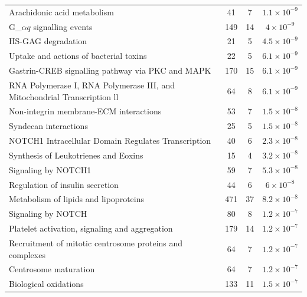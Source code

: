 \begin{table}[!Hp]
{\begin{tabular}{lccc}
  \rowcolor{Cluster_Red!20} 
  Arachidonic acid metabolism &  41 &   7 & $1.1 \times 10^{-9}$ \\ 
  \rowcolor{Cluster_Red!15} 
  G_${\alpha q}$ signalling events & 149 &  14 & $4 \times 10^{-9}$ \\ 
  \rowcolor{Cluster_Red!20} 
  HS-GAG degradation &  21 &   5 & $4.5 \times 10^{-9}$ \\ 
  \rowcolor{Cluster_Red!15} 
  Uptake and actions of bacterial toxins &  22 &   5 & $6.1 \times 10^{-9}$ \\ 
  \rowcolor{Cluster_Red!20} 
  Gastrin-CREB signalling pathway via PKC and MAPK & 170 &  15 & $6.1 \times 10^{-9}$ \\ 
  \rowcolor{Cluster_Red!15} 
  RNA Polymerase I, RNA Polymerase III, and Mitochondrial Transcription \textcolor{Cluster_Red!15}{ll}  &  64 &   8 & $6.1 \times 10^{-9}$ \\ 
  \rowcolor{Cluster_Red!20} 
  Non-integrin membrane-ECM interactions &  53 &   7 & $1.5 \times 10^{-8}$ \\ 
  \rowcolor{Cluster_Red!15} 
  Syndecan interactions &  25 &   5 & $1.5 \times 10^{-8}$ \\ 
  \rowcolor{Cluster_Red!20} 
  NOTCH1 Intracellular Domain Regulates Transcription &  40 &   6 & $2.3 \times 10^{-8}$ \\ 
  \rowcolor{Cluster_Red!15} 
  Synthesis of Leukotrienes and Eoxins &  15 &   4 & $3.2 \times 10^{-8}$ \\ 
  \rowcolor{Cluster_Red!20} 
  Signaling by NOTCH1 &  59 &   7 & $5.3 \times 10^{-8}$ \\ 
  \rowcolor{Cluster_Red!15} 
  Regulation of insulin secretion &  44 &   6 & $6 \times 10^{-8}$ \\ 
  \rowcolor{Cluster_Red!20} 
  Metabolism of lipids and lipoproteins & 471 &  37 & $8.2 \times 10^{-8}$ \\ 
  \rowcolor{Cluster_Red!15} 
  Signaling by NOTCH &  80 &   8 & $1.2 \times 10^{-7}$ \\ 
  \rowcolor{Cluster_Red!20} 
  Platelet activation, signaling and aggregation & 179 &  14 & $1.2 \times 10^{-7}$ \\ 
  \rowcolor{Cluster_Red!15} 
  Recruitment of mitotic centrosome proteins and complexes &  64 &   7 & $1.2 \times 10^{-7}$ \\ 
  \rowcolor{Cluster_Red!20} 
  Centrosome maturation &  64 &   7 & $1.2 \times 10^{-7}$ \\ 
  \rowcolor{Cluster_Red!15} 
  Biological oxidations & 133 &  11 & $1.5 \times 10^{-7}$ \\ 
  \hline
\end{tabular}
}
\end{table}


